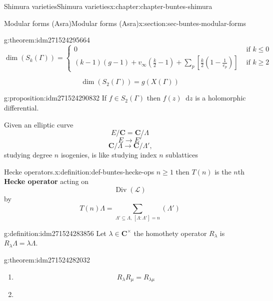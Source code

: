 \documentclass[oneside,10pt,]{book}
\newcommand{\terminology}[1]{\textbf{#1}}
\numberwithin{equation}{section}
\newcommand{\diff}{\mathop{}\!\mathrm{d}}
\newcommand{\CC}{\mathbf{C}}
\DeclareMathOperator{\divisors}{Div}
\newcommand{\amp}{&}
\begin{document}
\begin{chapterptx}{Shimura varieties}{}{Shimura varieties}{}{}{x:chapter:chapter-buntes-shimura}
\begin{sectionptx}{Modular forms (Asra)}{}{Modular forms (Asra)}{}{}{x:section:sec-buntes-modular-forms}
\begin{theorem}{}{}{g:theorem:idm271524295664}
\begin{equation*}
\dim(S_k(\Gamma)) =
\begin{cases}
0 \amp \text{ if } k \le 0 \\
(k-1)(g-1) + v_\infty (\frac k2 - 1) + \sum_p [\frac k2 (1- \frac{1}{e_p})] \amp \text{ if } k \ge 2
\end{cases}
\end{equation*}
%
\end{theorem}
%
\begin{equation*}
\dim(S_2(\Gamma)) = g(X(\Gamma))
\end{equation*}
%
\begin{proposition}{}{}{g:proposition:idm271524290832}%
If \(f \in S_2(\Gamma)\) then \(f(z) \diff z\) is a holomorphic differential.%
\end{proposition}
Given an elliptic curve%
\begin{equation*}
E/  \CC = \CC/\Lambda
\end{equation*}
%
\begin{equation*}
E \to E'
\end{equation*}
%
\begin{equation*}
\CC/\Lambda \to \CC/\Lambda'\text{,}
\end{equation*}
studying degree \(n\) isogenies, is like studying index  \(n \) sublattices%
\begin{definition}{Hecke operators.}{x:definition:def-buntes-hecke-ops}%
\(n \ge 1\) then \(T(n)\) is the  \(n\)th \terminology{Hecke operator} acting on%
\begin{equation*}
\divisors (\mathcal L)
\end{equation*}
by%
\begin{equation*}
T(n) \Lambda = \sum_{\Lambda' \subseteq \Lambda,\,[\Lambda : \Lambda'] = n} (\Lambda')
\end{equation*}
%
\end{definition}
\begin{definition}{}{g:definition:idm271524283856}%
Let \(\lambda \in \CC^\times\) the homothety operator \(R_\lambda\) is \(R_\lambda \Lambda = \lambda\Lambda\).%
\end{definition}
\begin{theorem}{}{}{g:theorem:idm271524282032}%
%
\begin{enumerate}
\item{}%
\begin{equation*}
R_\lambda R_\mu = R_{\lambda\mu}
\end{equation*}
%
\item{}%

\end{enumerate}
\end{theorem}
\end{sectionptx}
\end{chapterptx}
\end{document}
